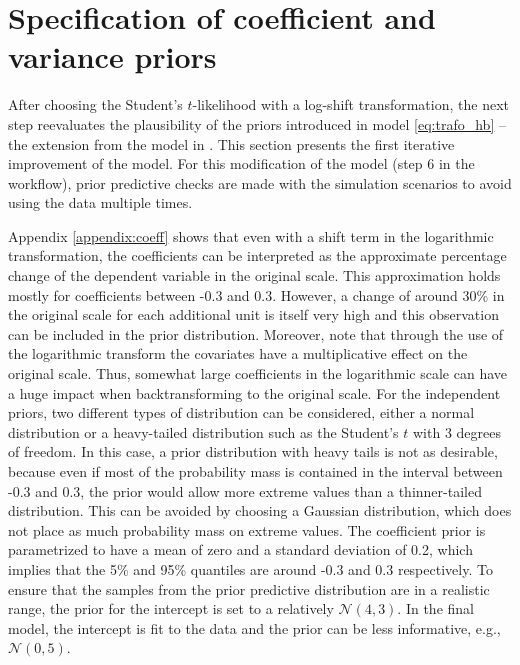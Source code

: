 \section{Specification of coefficient and variance priors}
\label{ch:coef_var_spec}

After choosing the Student's $t$-likelihood with a log-shift transformation, the next step reevaluates the plausibility of the priors introduced in model \ref{eq:trafo_hb} – the extension from the model in \cite{morelli_hierarchical_2021}.
This section presents the first iterative improvement of the model.
For this modification of the model (step 6 in the workflow), prior predictive checks are made with the simulation scenarios to avoid using the data multiple times.

Appendix \ref{appendix:coeff} shows that even with a shift term in the logarithmic transformation, the coefficients can be interpreted as the approximate percentage change of the dependent variable in the original scale.
This approximation holds mostly for coefficients between -0.3 and 0.3.
However, a change of around 30\% in the original scale for each additional unit is itself very high and this observation can be included in the prior distribution.
Moreover, note that through the use of the logarithmic transform the covariates have a multiplicative effect on the original scale.
Thus, somewhat large coefficients in the logarithmic scale can have a huge impact when backtransforming to the original scale.
For the independent priors, two different types of distribution can be considered, either a normal distribution or a heavy-tailed distribution such as the Student's $t$ with 3 degrees of freedom.
In this case, a prior distribution with heavy tails is not as desirable, because even if most of the probability mass is contained in the interval between -0.3 and 0.3, the prior would allow more extreme values than a thinner-tailed distribution.
This can be avoided by choosing a Gaussian distribution, which does not place as much probability mass on extreme values.
The coefficient prior is parametrized to have a mean of zero and a standard deviation of 0.2, which implies that the 5\% and 95\% quantiles are around -0.3 and 0.3 respectively.
To ensure that the samples from the prior predictive distribution are in a realistic range, the prior for the intercept is set to a relatively $\mathcal N (4, 3)$.
In the final model, the intercept is fit to the data and the prior can be less informative, e.g., $\mathcal N(0, 5)$.


